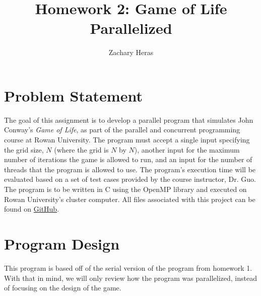 \documentclass{article}
\title{Homework 2: Game of Life Parallelized}
\author{Zachary Heras}
\begin{document}
	\maketitle
	
	\section{Problem Statement}
	The goal of this assignment is to develop a parallel program that simulates John Conway's \textit{Game of Life}, as part of the parallel and concurrent programming course at Rowan University. The program must accept a single input specifying the grid size, \(N\) (where the grid is \(N\) by \(N\)), another input for the maximum number of iterations the game is allowed to run, and an input for the number of threads that the program is allowed to use. The program's execution time will be evaluated based on a set of test cases provided by the course instructor, Dr. Guo. The program is to be written in C using the OpenMP library and executed on Rowan University's cluster computer. All files associated with this project can be found on \href{https://github.com/ZacharyHeras/parallel_and_concurrent_programming/tree/main/hw2}{GitHub}.

	\section{Program Design}
	This program is based off of the serial version of the program from homework 1. With that in mind, we will only review how the program was parallelized, instead of focusing on the design of the game.
	
\end{document}
